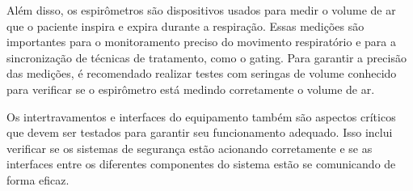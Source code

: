 \documentclass[11pt,a4paper]{article}
\begin{document}
	Além disso, os espirômetros são dispositivos usados para medir o volume de ar que o paciente inspira e expira durante a respiração. Essas medições são importantes para o monitoramento preciso do movimento respiratório e para a sincronização de técnicas de tratamento, como o gating. Para garantir a precisão das medições, é recomendado realizar testes com seringas de volume conhecido para verificar se o espirômetro está medindo corretamente o volume de ar.

	Os intertravamentos e interfaces do equipamento também são aspectos críticos que devem ser testados para garantir seu funcionamento adequado. Isso inclui verificar se os sistemas de segurança estão acionando corretamente e se as interfaces entre os diferentes componentes do sistema estão se comunicando de forma eficaz.


\end{document}
